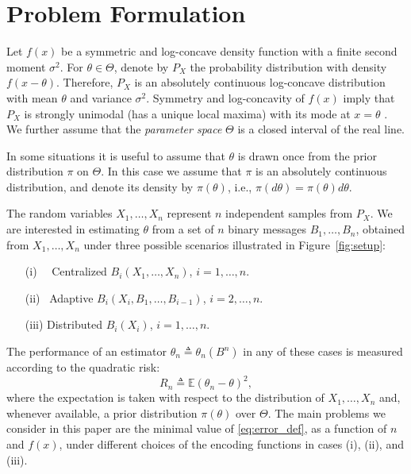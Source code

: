 
\section{Problem Formulation \label{sec:problem}}

Let $f(x)$ be a symmetric and log-concave density function with a finite second moment $\sigma^2$. For $\theta \in \Theta$, denote by $P_X$ the probability distribution with density $f\left( x-\theta \right)$. Therefore, $P_X$ is an absolutely continuous log-concave distribution with mean $\theta$ and variance $\sigma^2$. Symmetry and log-concavity of $f(x)$ imply that $P_X$ is strongly unimodal (has a unique local maxima) with its mode at $x =\theta$ \cite{ibragimov1956composition}. We further assume that the \emph{parameter space} $\Theta$ is a closed interval of the real line. 
\par
In some situations it is useful to assume that $\theta$ is drawn once from the prior distribution $\pi$ on $\Theta$. In this case we assume that $\pi$ is an absolutely continuous distribution, and denote its density by $\pi(\theta)$, i.e., $\pi(d\theta) = \pi(\theta)d\theta$.  
\par
The random variables $X_1,\ldots,X_n$ represent $n$ independent samples from $P_X$. 
We are interested in estimating $\theta$ from a set of $n$ binary messages $B_1,\ldots,B_n$, obtained from $X_1,\ldots,X_n$ under three possible scenarios illustrated in Figure~\ref{fig:setup}: 
\begin{itemize}
\item[(i)~~] Centralized $B_i(X_1,\ldots,X_n)$, $i=1,\ldots,n$.
\item[(ii)~] Adaptive $B_i(X_i,B_1,\ldots,B_{i-1})$, $i=2,\ldots,n$.
\item[(iii)] Distributed $B_i(X_i)$, $i=1,\ldots,n$.
\end{itemize}

The performance of an estimator ${\theta}_n \triangleq {\theta}_n(B^n)$ in any of these cases is measured according to the quadratic risk:
\begin{equation}
\label{eq:error_def}
R_n \triangleq \mathbb E\left({\theta}_n - \theta \right)^2,
\end{equation}
where the expectation is taken with respect to the distribution of $X_1,\ldots,X_n$ and, whenever available, a prior distribution $\pi(\theta)$ over $\Theta$.  
%
The main problems we consider in this paper are the minimal value of \eqref{eq:error_def}, as a function of $n$ and $f(x)$, under different choices of the encoding functions in cases (i), (ii), and (iii). \par

